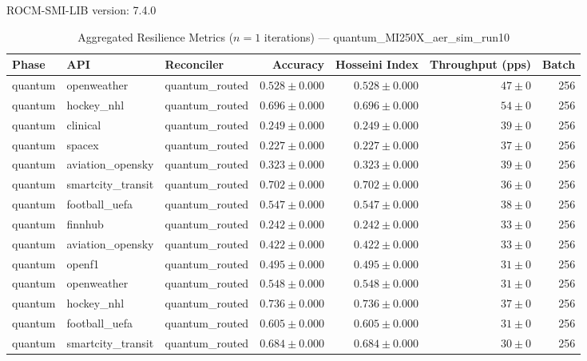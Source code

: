 ROCM-SMI-LIB version: 7.4.0

\begin{table}[htbp]
\caption{Aggregated Resilience Metrics ($n=1$ iterations) --- quantum_MI250X_aer_sim_run10}
\begin{tabular}{l l l r r r r}
\hline
Phase & API & Reconciler & Accuracy & Hosseini Index & Throughput (pps) & Batch \\
\hline
quantum & openweather & quantum\_routed & $0.528\pm0.000$ & $0.528\pm0.000$ & $47\pm0$ & 256 \\
quantum & hockey\_nhl & quantum\_routed & $0.696\pm0.000$ & $0.696\pm0.000$ & $54\pm0$ & 256 \\
quantum & clinical & quantum\_routed & $0.249\pm0.000$ & $0.249\pm0.000$ & $39\pm0$ & 256 \\
quantum & spacex & quantum\_routed & $0.227\pm0.000$ & $0.227\pm0.000$ & $37\pm0$ & 256 \\
quantum & aviation\_opensky & quantum\_routed & $0.323\pm0.000$ & $0.323\pm0.000$ & $39\pm0$ & 256 \\
quantum & smartcity\_transit & quantum\_routed & $0.702\pm0.000$ & $0.702\pm0.000$ & $36\pm0$ & 256 \\
quantum & football\_uefa & quantum\_routed & $0.547\pm0.000$ & $0.547\pm0.000$ & $38\pm0$ & 256 \\
quantum & finnhub & quantum\_routed & $0.242\pm0.000$ & $0.242\pm0.000$ & $33\pm0$ & 256 \\
quantum & aviation\_opensky & quantum\_routed & $0.422\pm0.000$ & $0.422\pm0.000$ & $33\pm0$ & 256 \\
quantum & openf1 & quantum\_routed & $0.495\pm0.000$ & $0.495\pm0.000$ & $31\pm0$ & 256 \\
quantum & openweather & quantum\_routed & $0.548\pm0.000$ & $0.548\pm0.000$ & $31\pm0$ & 256 \\
quantum & hockey\_nhl & quantum\_routed & $0.736\pm0.000$ & $0.736\pm0.000$ & $37\pm0$ & 256 \\
quantum & football\_uefa & quantum\_routed & $0.605\pm0.000$ & $0.605\pm0.000$ & $31\pm0$ & 256 \\
quantum & smartcity\_transit & quantum\_routed & $0.684\pm0.000$ & $0.684\pm0.000$ & $30\pm0$ & 256 \\

\end{tabular}
\end{table}
